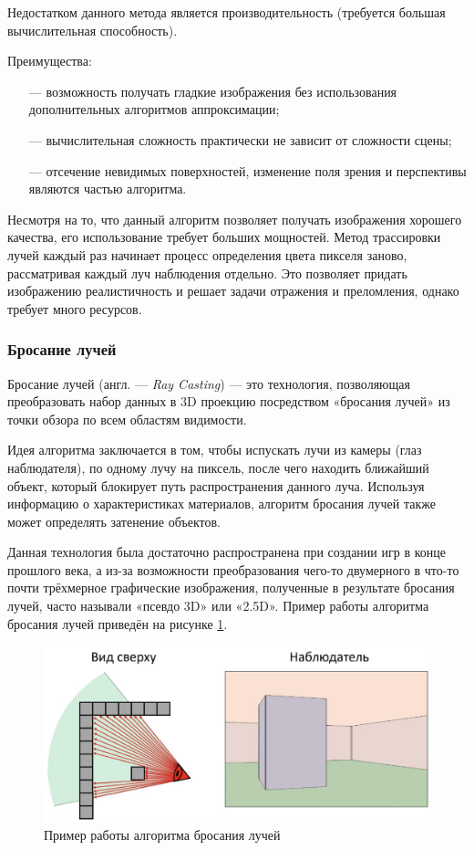 Недостатком данного метода является производительность (требуется большая вычислительная способность).


Преимущества:
\begin{itemize}[leftmargin=1.6\parindent]
	\item[---] возможность получать гладкие изображения без использования 
	дополнительных алгоритмов аппроксимации;
	\item[---] вычислительная сложность практически не зависит от сложности сцены;
	\item[---] отсечение невидимых поверхностей, изменение поля зрения и 
	перспективы являются частью алгоритма.
\end{itemize}

Несмотря на то, что данный алгоритм позволяет получать изображения 
хорошего качества, его использование требует больших мощностей.
Метод 
трассировки лучей каждый раз начинает процесс определения цвета пикселя 
заново, рассматривая каждый луч наблюдения отдельно.
Это позволяет придать 
изображению реалистичность и решает задачи отражения и преломления, 
однако требует много ресурсов.

\subsubsection{Бросание лучей}

Бросание лучей (англ. --- \textit{Ray Casting}) \cite{raycasting} --- это технология, позволяющая 
преобразовать набор данных в 3D проекцию посредством «бросания лучей» из 
точки обзора по всем областям видимости.

Идея алгоритма заключается в том, чтобы испускать лучи из камеры (глаз 
наблюдателя), по одному лучу на пиксель, после чего находить ближайший 
объект, который блокирует путь распространения данного луча.
Используя информацию о характеристиках материалов, алгоритм бросания лучей также может определять затенение объектов. 

Данная технология была достаточно распространена при создании игр в 
конце прошлого века, а из-за возможности преобразования чего-то двумерного 
в что-то почти трёхмерное графические изображения, полученные в результате 
бросания лучей, часто называли «псевдо 3D» или «2.5D».
Пример работы алгоритма бросания лучей приведён на рисунке \ref{fig:raycasting}.

\begin{figure}[h]
	\centering
	\captionsetup{justification=centering}
	\includegraphics[width=150mm]{img/raycasting.png}
	\caption{Пример работы алгоритма бросания лучей}
	\label{fig:raycasting}
\end{figure}

